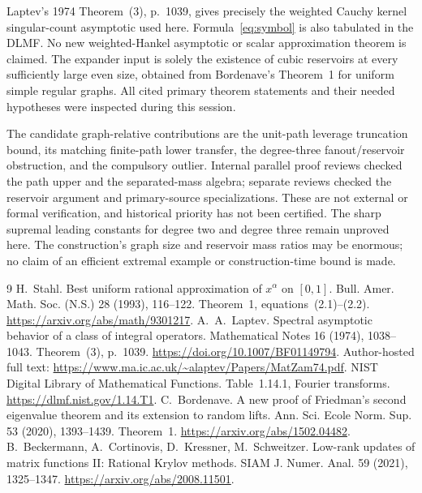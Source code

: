 \documentclass[11pt]{article}
\begin{document}
Laptev's 1974 Theorem~(3), p.~1039, gives precisely the weighted Cauchy
kernel singular-count asymptotic used here. Formula~\eqref{eq:symbol}
is also tabulated in the DLMF. No new weighted-Hankel asymptotic or
scalar approximation theorem is claimed. The expander input is solely
the existence of cubic reservoirs at every sufficiently large even
size, obtained from Bordenave's Theorem~1 for uniform simple regular
graphs. All cited primary theorem statements and their needed
hypotheses were inspected during this session.

The candidate graph-relative contributions are the unit-path
leverage truncation bound, its matching finite-path lower transfer,
the degree-three fanout/reservoir obstruction, and the compulsory
outlier. Internal parallel proof reviews checked the path upper and
the separated-mass algebra; separate reviews checked the reservoir
argument and primary-source specializations. These are not external
or formal verification, and historical priority has not been certified.
The sharp supremal leading constants for degree two and degree three
remain unproved here. The construction's graph size and reservoir
mass ratios may be enormous; no claim of an efficient extremal example
or construction-time bound is made.

\begin{thebibliography}{9}
 H.~Stahl. Best uniform rational approximation of
$x^\alpha$ on $[0,1]$. Bull. Amer. Math. Soc. (N.S.) 28 (1993), 116--122.
Theorem~1, equations~(2.1)--(2.2).
\url{https://arxiv.org/abs/math/9301217}.
 A.~A.~Laptev. Spectral asymptotic behavior of a class of
integral operators. Mathematical Notes 16 (1974), 1038--1043.
Theorem~(3), p.~1039. \url{https://doi.org/10.1007/BF01149794}.
Author-hosted full text:
\url{https://www.ma.ic.ac.uk/~alaptev/Papers/MatZam74.pdf}.
 NIST Digital Library of Mathematical Functions.
Table~1.14.1, Fourier transforms.
\url{https://dlmf.nist.gov/1.14.T1}.
 C.~Bordenave. A new proof of Friedman's second
eigenvalue theorem and its extension to random lifts.
Ann. Sci. Ecole Norm. Sup. 53 (2020), 1393--1439. Theorem~1.
\url{https://arxiv.org/abs/1502.04482}.
 B.~Beckermann, A.~Cortinovis, D.~Kressner,
M.~Schweitzer. Low-rank updates of matrix functions II: Rational Krylov
methods. SIAM J. Numer. Anal. 59 (2021), 1325--1347.
\url{https://arxiv.org/abs/2008.11501}.
\end{thebibliography}
\end{document}
